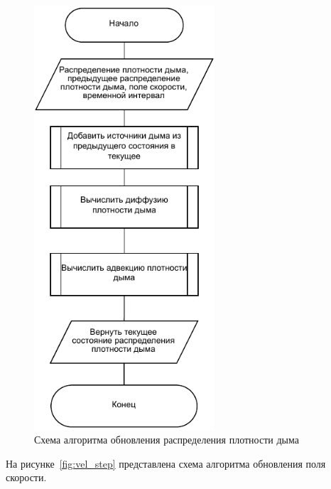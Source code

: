 \begin{figure}[H]
	\centering
	\includegraphics[width=0.6\textwidth, page=1]{assets/img/dens_step.pdf}   
	\caption{Схема алгоритма обновления распределения плотности дыма}
	\label{fig:dens_step}
\end{figure}

На рисунке~\ref{fig:vel_step} представлена схема алгоритма обновления поля скорости.

